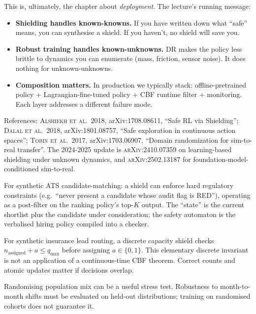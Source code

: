 \documentclass[11pt,oneside]{scrbook}
\begin{document}
\begin{safetyangle}
This is, ultimately, the chapter about \emph{deployment}. The lecture's
running message:
\begin{itemize}[leftmargin=*]
  \item \textbf{Shielding handles known-knowns.} If you have written down
        what ``safe'' means, you can synthesise a shield. If you haven't,
        no shield will save you.
  \item \textbf{Robust training handles known-unknowns.} DR makes the policy
        less brittle to dynamics you can enumerate (mass, friction, sensor
        noise). It does nothing for unknown-unknowns.
  \item \textbf{Composition matters.} In production we typically stack:
        offline-pretrained policy + Lagrangian-fine-tuned policy + CBF runtime
        filter + monitoring. Each layer addresses a different failure mode.
\end{itemize}
References: \textsc{Alshiekh et al.\ 2018}, arXiv:1708.08611, ``Safe RL via
Shielding''; \textsc{Dalal et al.\ 2018}, arXiv:1801.08757, ``Safe exploration
in continuous action spaces''; \textsc{Tobin et al.\ 2017}, arXiv:1703.06907,
``Domain randomization for sim-to-real transfer''. The 2024-2025 update is
\textsc{arXiv:2410.07359} on learning-based shielding under unknown dynamics,
and \textsc{arXiv:2502.13187} for foundation-model-conditioned sim-to-real.
\end{safetyangle}

\begin{matching}
For synthetic ATS candidate-matching: a shield can enforce hard regulatory
constraints (e.g.\ ``never present a candidate whose audit flag is RED''),
operating as a post-filter on the ranking policy's top-$K$ output. The
``state'' is the current shortlist plus the candidate under consideration;
the safety automaton is the verbalised hiring policy compiled into a
checker.

For synthetic insurance lead routing, a discrete capacity shield checks
$n_{\mathrm{assigned}}+a\leq q_{\max}$ before assigning $a\in\{0,1\}$.
This elementary discrete invariant is not an application of a continuous-time
CBF theorem. Correct counts and atomic updates matter if decisions overlap.

Randomising population mix can be a useful stress test. Robustness to
month-to-month shifts must be evaluated on held-out distributions; training
on randomised cohorts does not guarantee it.

\end{matching}
\end{document}

